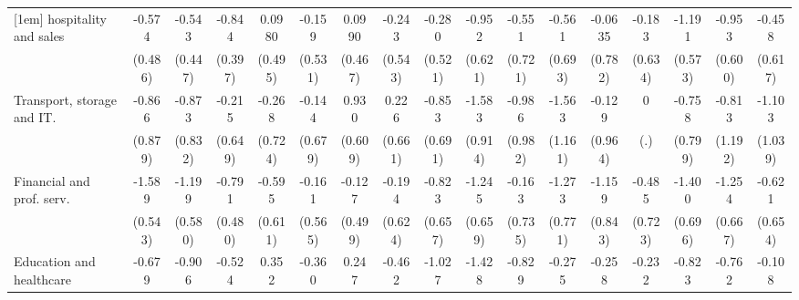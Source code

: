 {\begin{tabular}{l*{16}{c}}
[1em]
hospitality and sales&      -0.574         &      -0.543         &      -0.844\sym{*}  &      0.0980         &      -0.159         &      0.0990         &      -0.243         &      -0.280         &      -0.952         &      -0.551         &      -0.561         &     -0.0635         &      -0.183         &      -1.191\sym{*}  &      -0.953         &      -0.458         \\
                    &     (0.486)         &     (0.447)         &     (0.397)         &     (0.495)         &     (0.531)         &     (0.467)         &     (0.543)         &     (0.521)         &     (0.621)         &     (0.721)         &     (0.693)         &     (0.782)         &     (0.634)         &     (0.573)         &     (0.600)         &     (0.617)         \\
[1em]
Transport, storage and IT.&      -0.866         &      -0.873         &      -0.215         &      -0.268         &      -0.144         &       0.930         &       0.226         &      -0.853         &      -1.583         &      -0.986         &      -1.563         &      -0.129         &           0         &      -0.758         &      -0.813         &      -1.103         \\
                    &     (0.879)         &     (0.832)         &     (0.649)         &     (0.724)         &     (0.679)         &     (0.609)         &     (0.661)         &     (0.691)         &     (0.914)         &     (0.982)         &     (1.161)         &     (0.964)         &         (.)         &     (0.799)         &     (1.192)         &     (1.039)         \\
[1em]
Financial and prof. serv.&      -1.589\sym{**} &      -1.199\sym{*}  &      -0.791         &      -0.595         &      -0.161         &      -0.127         &      -0.194         &      -0.823         &      -1.245         &      -0.163         &      -1.273         &      -1.159         &      -0.485         &      -1.400\sym{*}  &      -1.254         &      -0.621         \\
                    &     (0.543)         &     (0.580)         &     (0.480)         &     (0.611)         &     (0.565)         &     (0.499)         &     (0.624)         &     (0.657)         &     (0.659)         &     (0.735)         &     (0.771)         &     (0.843)         &     (0.723)         &     (0.696)         &     (0.667)         &     (0.654)         \\
[1em]
Education and healthcare&      -0.679         &      -0.906         &      -0.524         &       0.352         &      -0.360         &       0.247         &      -0.462         &      -1.027         &      -1.428\sym{*}  &      -0.829         &      -0.275         &      -0.258         &      -0.232         &      -0.823         &      -0.762         &      -0.108         \\

\end{tabular}}
